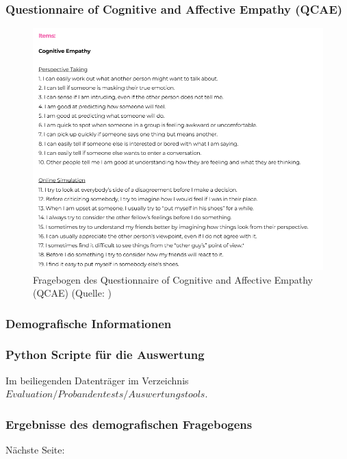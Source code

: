 \documentclass[
	12pt,
	a4paper,
	bibtotoc,
	cleardoubleempty, 
	idxtotoc,
	ngerman,
	openright
	final,
	listof=nochaptergap,
	]{scrbook}
\begin{document}
\begin{appendices}
\clearpage

\subsubsection{Questionnaire of Cognitive and Affective Empathy (QCAE)}

\begin{figure}[ht]
\centering
\includegraphics[width=1\linewidth]{content/attachments/questtionaires/QCAE.PNG}
\caption{Fragebogen des Questionnaire of Cognitive and Affective Empathy (QCAE) (Quelle: \citealp{noauthor_questionnaire_nodate})}
\label{fig:append_QCAE}
\end{figure}

\subsubsection{Demografische Informationen}\label{sec:append_study_demografic}



\subsubsection{Python Scripte für die Auswertung}
Im beiliegenden Datenträger im Verzeichnis $Evaluation/Probandentests/Auswertungstools$. 

\newpage

\subsubsection{Ergebnisse des demografischen Fragebogens}
Nächste Seite:


\end{appendices}
\end{document}
